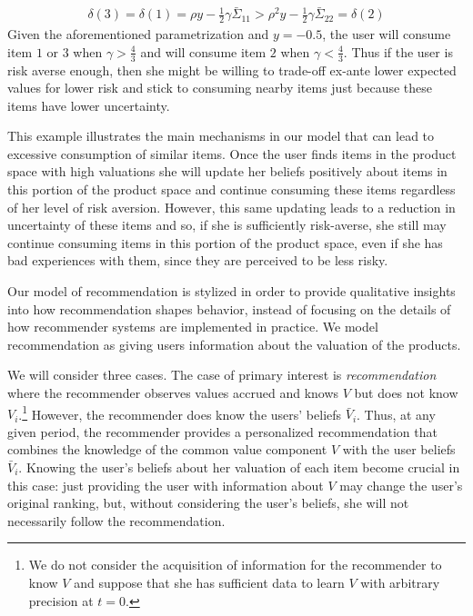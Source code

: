 \documentclass[format=acmsmall, review=false]{acmart}
\newcommand{\xhdr}[1]{\vspace{1mm} \noindent{\bf #1}}
\begin{document}
\begin{align*}
\delta(3) = \delta(1) = \rho y - \frac{1}{2} \gamma \bar{\Sigma}_{11} > \rho^{2} y - \frac{1}{2} \gamma \bar{\Sigma}_{22} = \delta(2)
\end{align*}
Given the aforementioned parametrization and $y = -0.5$, the user will consume item $1$ or $3$ when $\gamma > \frac{4}{3}$ and will consume item $2$ when $\gamma < \frac{4}{3}$. Thus if the user is risk averse enough, then she might be willing to trade-off ex-ante lower expected values for lower risk and stick to consuming nearby items just because these items have lower uncertainty. 
\par 
This example illustrates the main mechanisms in our model that can lead to excessive consumption of similar items. Once the user finds items in the product space with high valuations she will update her beliefs positively about items in this portion of the product space and continue consuming these items regardless of her level of risk aversion. However, this same updating leads to a reduction in uncertainty of these items and so, if she is sufficiently risk-averse, she still may continue consuming items in this portion of the product space, even if she has bad experiences with them, since they are perceived to be less risky. 
\par

\xhdr{Recommendation.}
Our model of recommendation is stylized in order to provide qualitative insights into how recommendation shapes behavior, instead of focusing on the details of how recommender systems are implemented in practice. We model recommendation as giving users information about the valuation of the products.
\par

We will consider three cases. The case of primary interest is \textit{recommendation} where the recommender observes values accrued and knows $V$ but does not know $V_i$.\footnote{We do not consider the acquisition of information for the recommender to know $V$ and suppose that she has sufficient data to learn $V$ with arbitrary precision at $t = 0$.} However, the recommender does know the users' beliefs $\bar V_i$. Thus, at any given period, the recommender provides a personalized recommendation that combines the knowledge of the common value component $V$ with the user beliefs $\bar V_i$. Knowing the user's beliefs about her valuation of each item become crucial in this case: just providing the user with information about $V$ may change the user's original ranking, but, without considering the user's beliefs, she will not necessarily follow the recommendation.
\par
\end{document}
